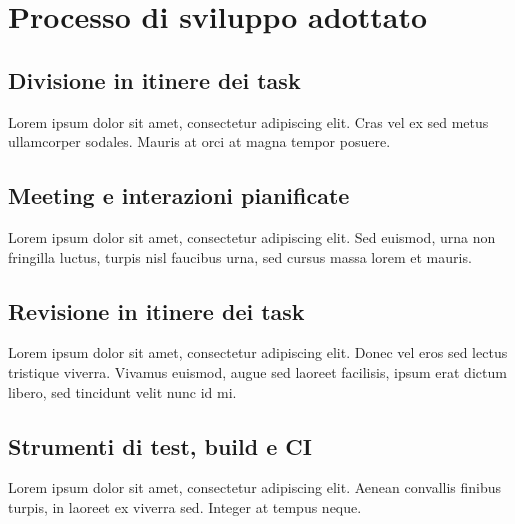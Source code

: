 \chapter{Processo di sviluppo adottato}

\section{Divisione in itinere dei task}
Lorem ipsum dolor sit amet, consectetur adipiscing elit. Cras vel ex sed metus
ullamcorper sodales. Mauris at orci at magna tempor posuere.

\section{Meeting e interazioni pianificate}
Lorem ipsum dolor sit amet, consectetur adipiscing elit. Sed euismod, urna non
fringilla luctus, turpis nisl faucibus urna, sed cursus massa lorem et mauris.

\section{Revisione in itinere dei task}
Lorem ipsum dolor sit amet, consectetur adipiscing elit. Donec vel eros sed
lectus tristique viverra. Vivamus euismod, augue sed laoreet facilisis, ipsum
erat dictum libero, sed tincidunt velit nunc id mi.

\section{Strumenti di test, build e CI}
Lorem ipsum dolor sit amet, consectetur adipiscing elit. Aenean convallis
finibus turpis, in laoreet ex viverra sed. Integer at tempus neque.
